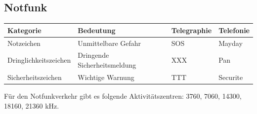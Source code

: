 \documentclass[11pt,BCOR=8.5mm]{scrartcl}
\begin{document}
\subsection{Notfunk}\label{sub:notfunk}

\begin{table}[h]
  \centering
\begin{tabular}{|l|l|l|l|}
        \hline
        Kategorie & Bedeutung & Telegraphie & Telefonie \\
        \hline
        Notzeichen & Unmittelbare Gefahr & SOS & Mayday \\
        Dringlichkeitszeichen & Dringende Sicherheitsmeldung & XXX & Pan \\
        Sicherheitszeichen & Wichtige Warnung & TTT & Securite \\
        \hline
\end{tabular}
\end{table}

Für den Notfunkverkehr gibt es folgende Aktivitätszentren: 3760, 7060,
14300, 18160, 21360 kHz.
\end{document}

